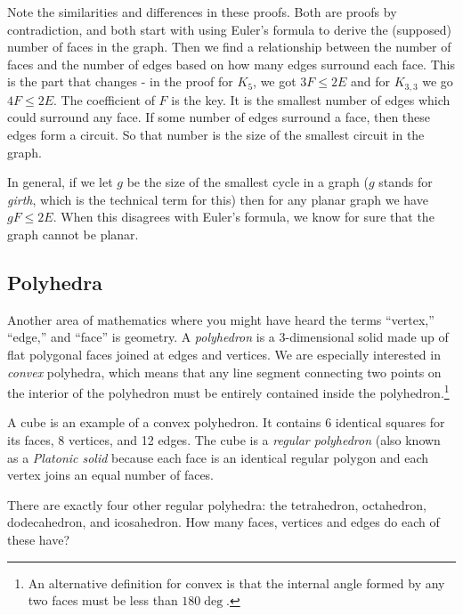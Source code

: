 \documentclass[12pt]{article}
\begin{document}
Note the similarities and differences in these proofs.  Both are proofs by contradiction, and both start with using Euler's formula to derive the (supposed) number of faces in the graph.  Then we find a relationship between the number of faces and the number of edges based on how many edges surround each face.  This is the part that changes - in the proof for $K_5$, we got $3F \le 2E$ and for $K_{3,3}$ we go $4F \le 2E$.  The coefficient of $F$ is the key.  It is the smallest number of edges which could surround any face.  If some number of edges surround a face, then these edges form a circuit.  So that number is the size of the smallest circuit in the graph.

In general, if we let $g$ be the size of the smallest cycle in a graph ($g$ stands for {\em girth}, which is the technical term for this) then for any planar graph we have $gF \le 2E$.  When this disagrees with Euler's formula, we know for sure that the graph cannot be planar.

\subsection{Polyhedra}

Another area of mathematics where you might have heard the terms ``vertex,'' ``edge,'' and ``face'' is geometry.  A \emph{polyhedron} is a 3-dimensional solid made up of flat polygonal faces joined at edges and vertices.  We are especially interested in \emph{convex} polyhedra, which means that any line segment connecting two points on the interior of the polyhedron must be entirely contained inside the polyhedron.\footnote{An alternative definition for convex is that the internal angle formed by any two faces must be less than $180\deg$.}

\begin{activity}
A cube is an example of a convex polyhedron.  It contains 6 identical squares for its faces, 8 vertices, and 12 edges.  The cube is a \emph{regular polyhedron} (also known as a \emph{Platonic solid} because each face is an identical regular polygon and each vertex joins an equal number of faces.

There are exactly four other regular polyhedra: the tetrahedron, octahedron, dodecahedron, and icosahedron.  How many faces, vertices and edges do each of these have?
\end{activity}

\end{document}
